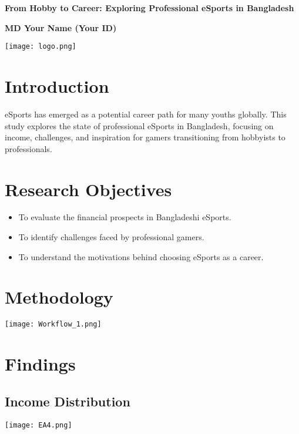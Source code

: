 \documentclass[a1paper,landscape]{a0poster}
\begin{document}
\begin{center}
    \veryHuge \textbf{From Hobby to Career: Exploring Professional eSports in Bangladesh} \par
    \vspace{1cm}
    \Large \textbf{MD Your Name (Your ID)} \par
    \vspace{1cm}
    \texttt{[image: logo.png]}
\end{center}

\vspace{1cm}

\begin{multicols}{3}

\section*{Introduction}
eSports has emerged as a potential career path for many youths globally. This study explores the state of professional eSports in Bangladesh, focusing on income, challenges, and inspiration for gamers transitioning from hobbyists to professionals.

\section*{Research Objectives}
\begin{itemize}
    \item To evaluate the financial prospects in Bangladeshi eSports.
    \item To identify challenges faced by professional gamers.
    \item To understand the motivations behind choosing eSports as a career.
\end{itemize}

\section*{Methodology}
\texttt{[image: Workflow\_1.png]}

\section*{Findings}
\subsection*{Income Distribution}
\texttt{[image: EA4.png]}


\end{multicols}
\end{document}
